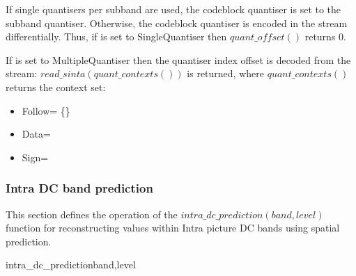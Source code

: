 If single quantisers per subband are used, the codeblock quantiser is set to the 
subband quantiser. Otherwise, the codeblock quantiser is encoded in the stream
differentially. Thus, if \CodeblockMode is set to SingleQuantiser then $quant\_offset()$
returns $0$.

If \CodeblockMode is set to MultipleQuantiser then the quantiser index offset
is decoded from the stream: $read\_sinta(quant\_contexts())$ is returned, where
$quant\_contexts()$ returns the context set:

\begin{itemize}
\item{Follow= \{\QOffsetFollow\}}
\item{Data=\QOffsetInfo}
\item{Sign=\QOffsetSign}
\end{itemize}

\subsubsection{Intra DC band prediction}
\label{intradcprediction}

This section defines the operation of the $intra\_dc\_prediction(band,level)$ function
for reconstructing values within Intra picture DC bands using spatial prediction.

\begin{pseudo}{intra\_dc\_prediction}{band,level}

      \bsEND
    \bsELSE
      \bsEND
    \bsEND
  \bsEND
\bsEND

\end{pseudo}
